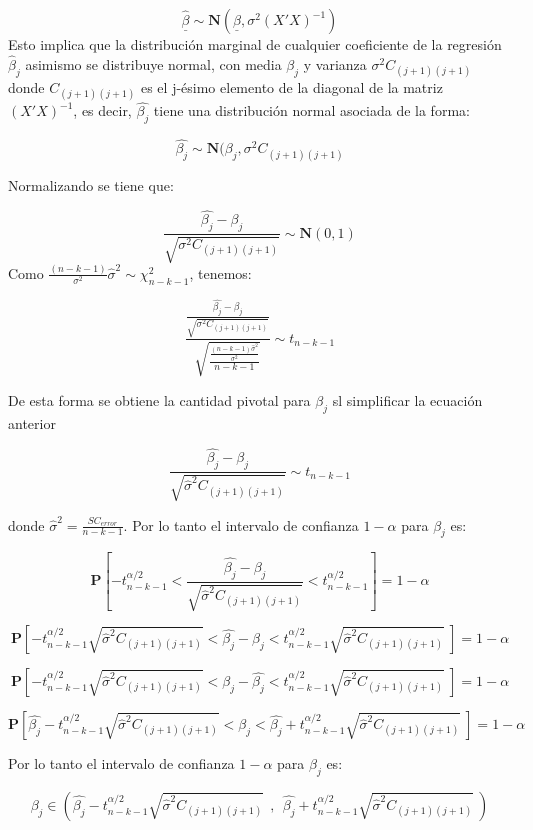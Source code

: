 \documentclass[
  a4paper,
  oneside,
  openany]{book}
\begin{document}
\[\underline{\hat{\beta}} \sim \mathbf{N}(\underline{\beta},\sigma^2(X'X)^{-1})\]
Esto implica que la distribución marginal de cualquier coeficiente de la regresión \(\hat{\beta}_{j}\) asimismo se distribuye normal, con media \(\beta_{j}\) y varianza \(\sigma^2 C_{(j+1)(j+1)}\) donde \(C_{(j+1)(j+1)}\) es el j-ésimo elemento de la diagonal de la matriz \((X'X)^{-1}\), es decir, \(\hat{\beta_{j}}\) tiene una distribución normal asociada de la forma:

\[\hat{\beta_{j}} \sim \mathbf{N}(\beta_{j}, \sigma^2C_{(j+1)(j+1)}\]

Normalizando se tiene que:

\[\frac{\hat{\beta_{j}}-\beta_{j}}{\sqrt{\sigma^2C_{(j+1)(j+1)}}}\sim \mathbf{N}(0,1)\]
Como \(\frac{(n-k-1)}{\sigma^2}\hat{\sigma}^2 \sim \chi^2_{n-k-1}\), tenemos:

\[\frac{\frac{\hat{\beta_{j}}-\beta_{j}}{\sqrt{\sigma^2C_{(j+1)(j+1)}}}}{\sqrt{\frac{\frac{(n-k-1)\hat{\sigma}^2}{\sigma^2}}{n-k-1}}} \sim t_{n-k-1}\]

De esta forma se obtiene la cantidad pivotal para \(\beta_{j}\) sl simplificar la ecuación anterior

\[\frac{\hat{\beta_{j}}-\beta_{j}}{\sqrt{\hat{\sigma}^2C_{(j+1)(j+1)}}}\sim t_{n-k-1}\]

donde \(\hat{\sigma}^2=\frac{SC_{error}}{n-k-1}\). Por lo tanto el intervalo de confianza \(1-\alpha\) para \(\beta_{j}\) es:

\[\mathbf{P} \left[-t^{\alpha/2}_{n-k-1} < \frac{\hat{\beta_{j}}-\beta_{j}}{\sqrt{\hat{\sigma}^2C_{(j+1)(j+1)}}} < t^{\alpha/2}_{n-k-1} \right]= 1- \alpha\]

\[\mathbf{P} \left[-t^{\alpha/2}_{n-k-1}{\sqrt{\hat{\sigma}^2C_{(j+1)(j+1)}}} < \hat{\beta_{j}}-\beta_{j} < t^{\alpha/2}_{n-k-1}{\sqrt{\hat{\sigma}^2C_{(j+1)(j+1)}}} \  \right]= 1- \alpha\]

\[\mathbf{P} \left[-t^{\alpha/2}_{n-k-1}{\sqrt{\hat{\sigma}^2C_{(j+1)(j+1)}}} < \beta_{j}-\hat{\beta_{j}} < t^{\alpha/2}_{n-k-1}{\sqrt{\hat{\sigma}^2C_{(j+1)(j+1)}}}  \ \right]= 1- \alpha\]

\[\mathbf{P} \left[\hat{\beta_{j}}-t^{\alpha/2}_{n-k-1}{\sqrt{\hat{\sigma}^2C_{(j+1)(j+1)}}} < \beta_{j} < \hat{\beta_{j}}+t^{\alpha/2}_{n-k-1}{\sqrt{\hat{\sigma}^2C_{(j+1)(j+1)}}}  \ \right]= 1- \alpha\]

Por lo tanto el intervalo de confianza \(1-\alpha\) para \(\beta_{j}\) es:

\[\beta_{j} \in \left(\hat{\beta_{j}}-t^{\alpha/2}_{n-k-1}{\sqrt{\hat{\sigma}^2C_{(j+1)(j+1)}}} \ \ , \ \ \hat{\beta_{j}}+t^{\alpha/2}_{n-k-1}{\sqrt{\hat{\sigma}^2C_{(j+1)(j+1)}}} \ \right)\]
\end{document}
